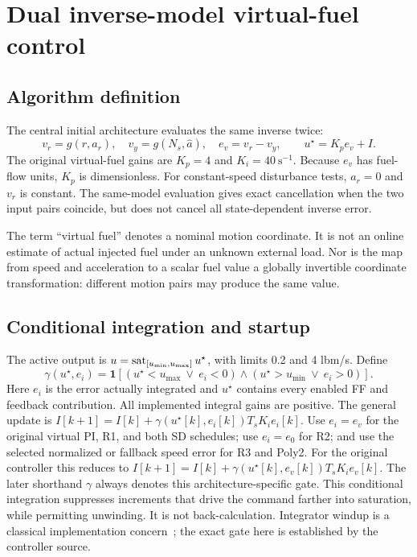 \section{Dual inverse-model virtual-fuel control}
\subsection{Algorithm definition}
The central initial architecture evaluates the same inverse twice:
\begin{equation}
v_r=g(r,a_r),\quad v_y=g(N_s,\hat a),\quad e_v=v_r-v_y,
\qquad u^\star=K_p e_v+I.
\label{eq:virtual}
\end{equation}
The original virtual-fuel gains are $K_p=4$ and $K_i=40\ \mathrm{s}^{-1}$. Because $e_v$ has fuel-flow units, $K_p$ is dimensionless. For constant-speed disturbance tests, $a_r=0$ and $v_r$ is constant. The same-model evaluation gives exact cancellation when the two input pairs coincide, but does not cancel all state-dependent inverse error.

The term ``virtual fuel'' denotes a nominal motion coordinate. It is not an online estimate of actual injected fuel under an unknown external load. Nor is the map from speed and acceleration to a scalar fuel value a globally invertible coordinate transformation: different motion pairs may produce the same value.

\subsection{Conditional integration and startup}
The active output is $u=\operatorname{sat}_{[u_{\min},u_{\max}]}u^\star$, with limits 0.2 and 4 lbm/s. Define
\begin{equation}
\gamma(u^\star,e_i)=\mathbf1\!\left[(u^\star<u_{\max}\ \lor\ e_i<0)
\land(u^\star>u_{\min}\ \lor\ e_i>0)\right].
\end{equation}
Here $e_i$ is the error actually integrated and $u^\star$ contains every enabled FF and feedback contribution. All implemented integral gains are positive. The general update is
$I[k+1]=I[k]+\gamma(u^\star[k],e_i[k])T_sK_i e_i[k]$.
Use $e_i=e_v$ for the original virtual PI, R1, and both SD schedules; use $e_i=e_0$ for R2; and use the selected normalized or fallback speed error for R3 and Poly2. For the original controller this reduces to $I[k+1]=I[k]+\gamma(u^\star[k],e_v[k])T_sK_i e_v[k]$.
The later shorthand $\gamma$ always denotes this architecture-specific gate. This conditional integration suppresses increments that drive the command farther into saturation, while permitting unwinding. It is not back-calculation. Integrator windup is a classical implementation concern~\cite{windup}; the exact gate here is established by the controller source.

